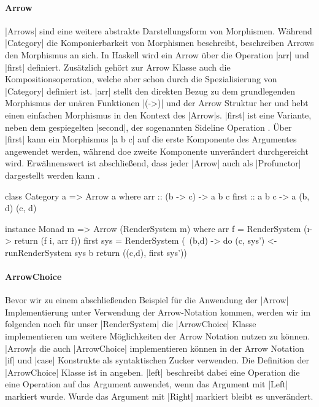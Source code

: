 
\paragraph{Arrow}

|Arrows| sind eine weitere abstrakte Darstellungsform von Morphismen. Während |Category| die Komponierbarkeit von Morphismen beschreibt, beschreiben Arrows den Morphismus an sich. In Haskell wird ein Arrow über die Operation |arr| und |first| definiert. Zusätzlich gehört zur Arrow Klasse auch die Kompositionsoperation, welche aber schon durch die Spezialisierung von |Category| definiert ist. |arr| stellt den direkten Bezug zu dem grundlegenden Morphismus der unären Funktionen |(->)| und der Arrow Struktur her und hebt einen einfachen Morphismus in den Kontext des |Arrow|s. |first| ist eine Variante, neben dem gespiegelten |second|, der sogenannten Sideline Operation \parencite[Kapitel 1]{Asada2010}. Über |first| kann ein Morphismus |a b c| auf die erste Komponente des Argumentes angewendet werden, während doe zweite Komponente unverändert durchgereicht wird. Erwähnenswert ist abschließend, dass jeder |Arrow| auch als |Profunctor| dargestellt werden kann \parencite[Kapitel 3]{Asada2010}.

\begin{haskell}[label={lst:class-arrow},caption={Arrow Klasse\protect\footnotemark},nolol,float,floatplacement=H]
class Category a => Arrow a where
  arr :: (b -> c) -> a b c
  first :: a b c -> a (b, d) (c, d)
\end{haskell}


\begin{haskell}[label={lst:rendersystem-arrow},caption={Arrow Instanz für RenderSystem},float,floatplacement=H]
instance Monad m => Arrow (RenderSystem m) where
  arr f = RenderSystem (\i -> return (f i, arr f))
  first sys = RenderSystem (\ (b,d) -> do
    (c, sys') <- runRenderSystem sys b
    return ((c,d), first sys'))
\end{haskell}


\paragraph{ArrowChoice}

Bevor wir zu einem abschließenden Beispiel für die Anwendung der |Arrow| Implementierung unter Verwendung der Arrow-Notation \footnotemark kommen, werden wir im folgenden noch für unser |RenderSystem| die |ArrowChoice| Klasse implementieren um weitere Möglichkeiten der Arrow Notation nutzen zu können. |Arrow|s die auch |ArrowChoice| implementieren können in der Arrow Notation |if| und |case| Konstrukte als syntaktischen Zucker verwenden. Die Definition der |ArrowChoice| Klasse ist in  angeben. |left| beschreibt dabei eine Operation die eine Operation auf das Argument anwendet, wenn das Argument mit |Left| markiert wurde. Wurde das Argument mit |Right| markiert bleibt es unverändert.

